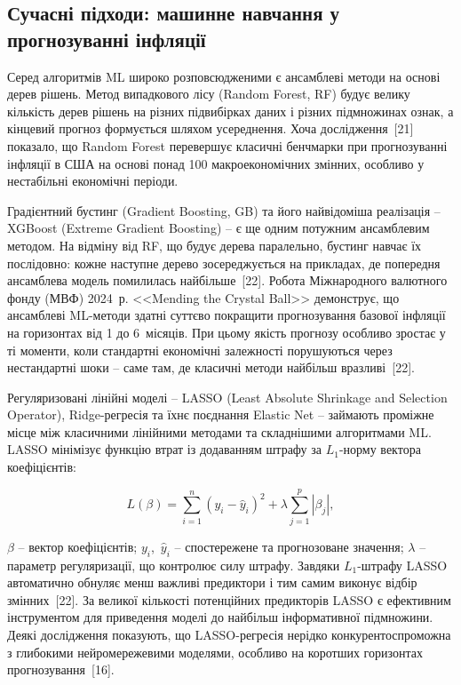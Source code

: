 \documentclass{bachelor_thesis}
\begin{document}
\subsection{Сучасні підходи: машинне навчання у прогнозуванні інфляції}

Серед алгоритмів ML широко розповсюдженими є ансамблеві методи на основі дерев рішень. Метод випадкового лісу (Random Forest, RF) будує велику кількість дерев рішень на різних підвибірках даних і різних підмножинах ознак, а кінцевий прогноз формується шляхом усереднення. Хоча дослідження~[21] показало, що Random Forest перевершує класичні бенчмарки при прогнозуванні інфляції в США на основі понад 100 макроекономічних змінних, особливо у нестабільні економічні періоди.

Градієнтний бустинг (Gradient Boosting, GB) та його найвідоміша реалізація -- XGBoost (Extreme Gradient Boosting) -- є ще одним потужним ансамблевим методом. На відміну від RF, що будує дерева паралельно, бустинг навчає їх послідовно: кожне наступне дерево зосереджується на прикладах, де попередня ансамблева модель помилилась найбільше~[22]. Робота Міжнародного валютного фонду (МВФ) 2024~р. <<Mending the Crystal Ball>> демонструє, що ансамблеві ML-методи здатні суттєво покращити прогнозування базової інфляції на горизонтах від 1 до 6~місяців. При цьому якість прогнозу особливо зростає у ті моменти, коли стандартні економічні залежності порушуються через нестандартні шоки -- саме там, де класичні методи найбільш вразливі~[22].

Регуляризовані лінійні моделі -- LASSO (Least Absolute Shrinkage and Selection Operator), Ridge-регресія та їхнє поєднання Elastic Net -- займають проміжне місце між класичними лінійними методами та складнішими алгоритмами ML. LASSO мінімізує функцію втрат із додаванням штрафу за $L_1$-норму вектора коефіцієнтів:

\begin{equation*}
L(\beta) = \sum_{i=1}^{n}(y_i - \hat{y}_i)^2 + \lambda\sum_{j=1}^{p}|\beta_j|,
\end{equation*}

 $\beta$ -- вектор коефіцієнтів; $y_i$,~$\hat{y}_i$ -- спостережене та прогнозоване значення; $\lambda$ -- параметр регуляризації, що контролює силу штрафу. Завдяки $L_1$-штрафу LASSO автоматично обнуляє менш важливі предиктори і тим самим виконує відбір змінних~[22]. За великої кількості потенційних предикторів LASSO є ефективним інструментом для приведення моделі до найбільш інформативної підмножини. Деякі дослідження показують, що LASSO-регресія нерідко конкурентоспроможна з глибокими нейромережевими моделями, особливо на коротших горизонтах прогнозування~[16].
\end{document}

